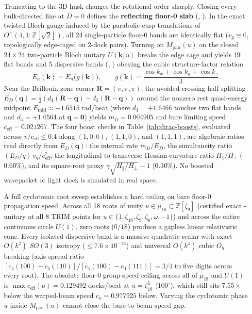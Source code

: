 Truncating to the 3D husk changes the rotational order sharply. Closing every bulk-directed line at $D = 0$ defines the
\textbf{reflecting floor-0 slab} (\mbox{}, \mbox{}). In the exact twisted-Bloch gauge
induced by the parabolic cusp translations of $O^+(4,1; \mathbb{Z}[\sqrt{2}])$, all 24 single-particle floor-0 bands
are identically flat ($v_g \equiv 0$, topologically edge-caged on 2-dock pairs). Turning on $M_{\mathrm{pair}}(u)$ on
the closed $24 \times 24$ two-particle Bloch unitary $U(\mathbf{k}, u)$ \cite{strauch2006} breaks the edge cage and
yields 19 flat bands and 5 dispersive bands (, ) obeying the cubic structure-factor
relation
\begin{equation}
E_n(\mathbf{k}) = E_n\bigl(g(\mathbf{k})\bigr),
\qquad
g(\mathbf{k}) = \frac{\cos k_x + \cos k_y + \cos k_z}{3}.
\label{eq:cubic-structure-factor}
\end{equation}
Near the Brillouin-zone corner $\mathbf{R} = (\pi, \pi, \pi)$, the avoided-crossing half-splitting
$E_D(\mathbf{q}) = \frac{1}{2}(d_4(\mathbf{R}-\mathbf{q}) - d_3(\mathbf{R}-\mathbf{q}))$ around the nonzero rest
quasi-energy midpoint $E_{\mathrm{mid}} \approx +1.6515\text{ rad/beat}$ (where $d_3 = +1.6466$ touches two flat bands
and $d_4 = +1.6564$ at $\mathbf{q} = \mathbf{0}$) yields $m_D = 0.004905$ and bare limiting speed
$c_{\mathrm{eff}} = 0.021267$. The four boost checks in Table~\ref{tab:dirac-boosts}, evaluated across
$v / c_{\mathrm{eff}} \le 0.4$ along $(1,0,0)$, $(1,1,0)$, and $(1,1,1)$, are algebraic ratios read directly from
$E_D(\mathbf{q})$: the internal rate $m_D / E_D$, the simultaneity ratio $(E_D/q)\, v_g / c_{\mathrm{eff}}^2$, the
longitudinal-to-transverse Hessian curvature ratio $H_\parallel / H_\perp$ ($0.60\%$), and its square-root proxy
$\gamma\sqrt{H_\parallel / H_\perp} - 1$ ($0.30\%$). No boosted wavepacket or light clock is simulated in real space.

A full cyclotomic root sweep establishes a hard ceiling on bare floor-0 propagation speed. Across all 18 roots of unity
$u \in \mu_{18} \subset \mathbb{Z}[\zeta_9]$ (certified exact -unitary at all 8 TRIM points for
$u \in \{1, \zeta_{18}, \zeta_9, \zeta_6, \omega, -1\}$) and across the entire continuous circle $U(1)$, zero roots
($0/18$) produce a gapless linear relativistic cone. Every isolated dispersive band is a massive quadratic scalar with
exact $O(k^2)$ $SO(3)$ isotropy ($\le 7.6 \times 10^{-12}$) and universal $O(k^4)$ cubic $O_h$ breaking (axis-spread
ratio $[c_4(100) - c_4(110)] / [c_4(100) - c_4(111)] = 3/4$ to five digits across every root). The absolute floor-0
group-speed ceiling across all of $\mu_{18}$ and $U(1)$ is $\max c_{\mathrm{eff}}(u) = 0.129492$ docks/beat at
$u = \zeta_{18}^5$ ($100^\circ$), which still sits $7.55\times$ below the warped-beam speed $c_u = 0.977925$ below.
Varying the cyclotomic phase $u$ inside $M_{\mathrm{pair}}(u)$ cannot close the bare-to-beam speed gap.

